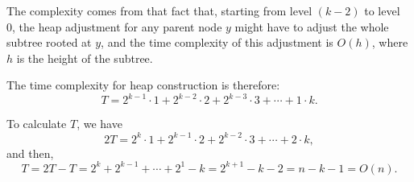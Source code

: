 \documentclass[11pt, oneside]{article}   	%
\begin{document}
The complexity comes from that fact that, starting from level $(k-2)$ to level 0, the heap adjustment for any parent node $y$ might have to adjust the whole subtree rooted at $y$, and the time complexity of this adjustment is $O(h)$, where $h$ is the height of the subtree.

The time complexity for heap construction is therefore:
\[T = 2^{k-1} \cdot 1 + 2^{k-2}\cdot 2 + 2^{k-3}\cdot 3 + \cdots + 1\cdot k.\]

To calculate $T$, we have
\[2T = 2^k \cdot 1 + 2^{k-1}\cdot 2 + 2^{k-2}\cdot 3 + \cdots + 2\cdot k,\]
and then,
\[T = 2T - T = 2^k + 2^{k-1} + \cdots + 2^1 - k = 2^{k+1} - k - 2 =  n - k -1 = O(n).\]
\end{document}
